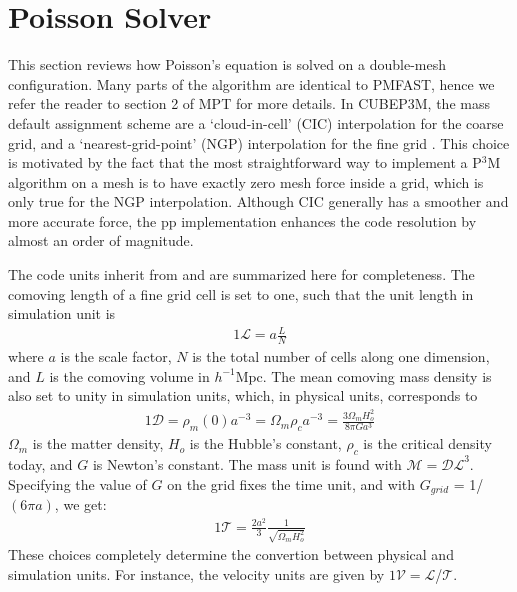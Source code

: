 \section{Poisson Solver}
\label{sec:Poisson}


This section reviews how Poisson's equation is solved on a double-mesh configuration. 
Many parts of the algorithm are identical to {\small PMFAST}, hence we refer the reader 
to section 2 of MPT for more details. In {\small CUBEP3M}, the mass default assignment scheme are
a `cloud-in-cell' (CIC) interpolation for the coarse grid,  and a `nearest-grid-point' (NGP) interpolation 
for the fine grid \citep{1981csup.book.....H}. This choice is motivated by the fact that the most straightforward 
way to implement a P$^3$M algorithm on a mesh is to have exactly zero mesh force inside a grid, 
which is only true for the NGP interpolation. Although CIC generally has a smoother and more accurate force,
the pp implementation enhances the code resolution by almost an order of magnitude. 

The code units inherit from \citep{2004NewA....9..443T} and are summarized here for completeness.
The comoving length of a fine grid cell is set to one,
such that the unit length in simulation unit is 
\begin{eqnarray}
1\mathcal{L} = a \frac{L}{N} 
\end{eqnarray}
where $a$ is the scale factor, $N$ is the total number of cells along one dimension,
and $L$ is the comoving volume in $h^{-1}\mbox{Mpc}$.
The mean comoving mass density is also set to unity in simulation units, 
which, in physical units, corresponds to 
\begin{eqnarray}
1\mathcal{D} = \rho_{m}(0) a^{-3} = \Omega_{m} \rho_{c} a^{-3} = \frac{3 \Omega_{m} H_{o}^{2}}{8 \pi G a^{3} }
\end{eqnarray}
$\Omega_{m}$ is the matter density, $H_{o}$ is the Hubble's constant, $\rho_{c}$ is the critical density today,
and $G$ is Newton's constant. The mass unit is found with $\mathcal{M} = \mathcal{DL}^{3}$.
Specifying the value of $G$ on the grid fixes the time unit, and with $G_{grid}$ = 1/$(6 \pi a)$,
we get:
\begin{eqnarray}
1 \mathcal{T} = \frac{2a^{2}}{3}\frac{1}{\sqrt{\Omega_{m}H_{o}^{2}}}
\end{eqnarray}
These choices completely determine the convertion between physical and simulation units.
For instance, the velocity units are given by $1\mathcal{V} = \mathcal{L}$/$\mathcal{T}$.



